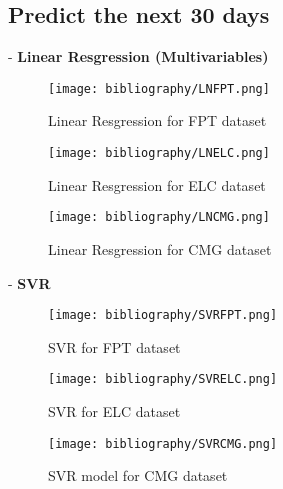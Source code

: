 \documentclass{ieeeojies}
\begin{document}
\subsection{Predict the next 30 days}
- \textbf{Linear Resgression (Multivariables)} \\
\begin{figure}[H]
  \centering
  \begin{minipage}{0.8\linewidth}
    \centering
    \texttt{[image: bibliography/LNFPT.png]}
    \caption{Linear Resgression for FPT dataset}
    \label{fig:}
  \end{minipage}
\end{figure}
\begin{figure}[H]
  \centering
  \begin{minipage}{0.8\linewidth}
    \centering
    \texttt{[image: bibliography/LNELC.png]}
    \caption{Linear Resgression for ELC dataset}
    \label{fig:}
  \end{minipage}
\end{figure}
\begin{figure}[H]
  \centering
  \begin{minipage}{0.8\linewidth}
    \centering
    \texttt{[image: bibliography/LNCMG.png]}
    \caption{Linear Resgression for CMG dataset}
    \label{fig:}
  \end{minipage}
\end{figure}
- \textbf{SVR}\\
\begin{figure}[H]
  \centering
  \begin{minipage}{0.8\linewidth}
    \centering
    \texttt{[image: bibliography/SVRFPT.png]}
    \caption{SVR for FPT dataset}
    \label{fig:}
  \end{minipage}
\end{figure}
\begin{figure}[H]
  \centering
  \begin{minipage}{0.8\linewidth}
    \centering
    \texttt{[image: bibliography/SVRELC.png]}
        \caption{SVR for ELC dataset}
        \label{fig:}
  \end{minipage}
\end{figure}
\begin{figure}[H]
  \centering
  \begin{minipage}{0.8\linewidth}
    \centering
    \texttt{[image: bibliography/SVRCMG.png]}
        \caption{SVR model for CMG dataset}
        \label{fig:}
  \end{minipage}
\end{figure}
\end{document}
